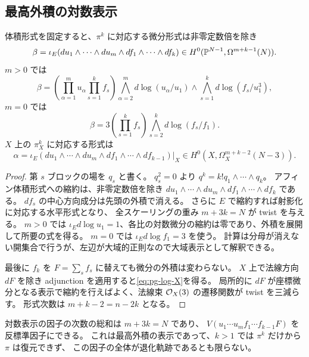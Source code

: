 \subsection{最高外積の対数表示}
\begin{proposition}\label{prop:pg-log}
体積形式を固定すると、$\pi^k$ に対応する微分形式は非零定数倍を除き
\begin{equation}
\beta=\iota_E(du_1\wedge\cdots\wedge du_m\wedge df_1\wedge\cdots\wedge df_k)
\in H^0(\mathbb P^{N-1},\Omega^{m+k-1}(N)).\label{eq:pg-log-main}
\end{equation}
$m>0$ では
\[
\beta=\left(\prod_{\alpha=1}^m u_\alpha\prod_{s=1}^kf_s\right)
\bigwedge_{\alpha=2}^m d\log(u_\alpha/u_1)
\wedge\bigwedge_{s=1}^k d\log(f_s/u_1^3),
\]
$m=0$ では
\[
\beta=3\left(\prod_{s=1}^kf_s\right)
\bigwedge_{s=2}^k d\log(f_s/f_1).
\]
$X$ 上の $\pi_X^k$ に対応する形式は
\begin{equation}
\alpha=\iota_E(du_1\wedge\cdots\wedge du_m\wedge df_1\wedge\cdots\wedge df_{k-1})|_X
\in H^0(X,\Omega_X^{m+k-2}(N-3)).\label{eq:pg-log-X}
\end{equation}
\end{proposition}
\begin{proof}
第 $s$ ブロックの場を $q_s$ と書く。
$q_s^2=0$ より $q^k=k!q_1\wedge\cdots\wedge q_k$。
アフィン体積形式への縮約は、非零定数倍を除き
$du_1\wedge\cdots\wedge du_m\wedge df_1\wedge\cdots\wedge df_k$ である。
$df_s$ の中心方向成分は先頭の外積で消える。
さらに $E$ で縮約すれば射影化に対応する水平形式となり、
全スケーリングの重み $m+3k=N$ が twist を与える。
$m>0$ では $\iota_Ed\log u_1=1$、各比の対数微分の縮約は零であり、外積を展開して所要の式を得る。
$m=0$ では $\iota_Ed\log f_1=3$ を使う。
計算は分母が消えない開集合で行うが、左辺が大域的正則なので大域表示として解釈できる。

最後に $f_k$ を $F=\sum_sf_s$ に替えても微分の外積は変わらない。
$X$ 上で法線方向 $dF$ を除き adjunction を適用すると\eqref{eq:pg-log-X}を得る。
局所的に $dF$ が座標微分となる表示で縮約を行えばよく、法線束 $\mathcal O_X(3)$ の遷移関数が twist を三減らす。
形式次数は $m+k-2=n-2k$ となる。
\end{proof}
対数表示の因子の次数の総和は $m+3k=N$ であり、
$V(u_1\cdots u_mf_1\cdots f_{k-1}F)$ を反標準因子にできる。
これは最高外積の表示であって、$k>1$ では $\pi^k$ だけから $\pi$ は復元できず、
この因子の全体が退化軌跡であるとも限らない。

